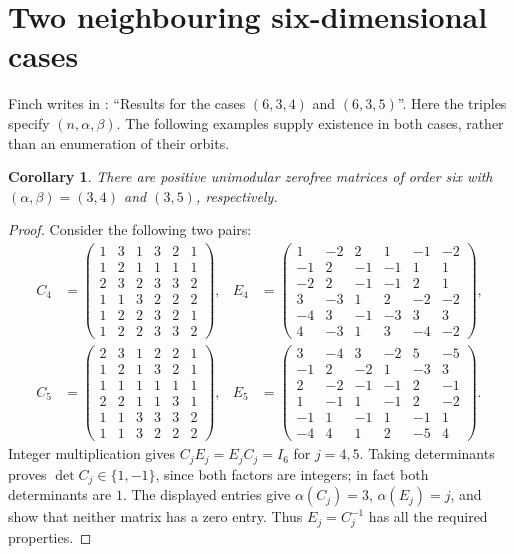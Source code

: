 \documentclass[11pt,a4paper]{article}
\newtheorem{corollary}[theorem]{Corollary}
\begin{document}
\section{Two neighbouring six-dimensional cases}
Finch writes in \cite[Section 8, p.~11]{finch}:
``Results for the cases $(6,3,4)$ and $(6,3,5)$''.
Here the triples specify $(n,\alpha,\beta)$. The following examples supply
existence in both cases, rather than an enumeration of their orbits.

\begin{corollary}\label{cor:neighbours}
There are positive unimodular zerofree matrices of order six with
$(\alpha,\beta)=(3,4)$ and $(3,5)$, respectively.
\end{corollary}
\begin{proof}
Consider the following two pairs:
\begin{align*}
 C_4&=\begin{pmatrix}
 1&3&1&3&2&1\\1&2&1&1&1&1\\2&3&2&3&3&2\\
 1&1&3&2&2&2\\1&2&2&3&2&1\\1&2&2&3&3&2
 \end{pmatrix},&
 E_4&=\begin{pmatrix}
 1&-2&2&1&-1&-2\\-1&2&-1&-1&1&1\\-2&2&-1&-1&2&1\\
 3&-3&1&2&-2&-2\\-4&3&-1&-3&3&3\\4&-3&1&3&-4&-2
 \end{pmatrix},\\[4pt]
 C_5&=\begin{pmatrix}
 2&3&1&2&2&1\\1&2&1&3&2&1\\1&1&1&1&1&1\\
 2&2&1&1&3&1\\1&1&3&3&3&2\\1&1&3&2&2&2
 \end{pmatrix},&
 E_5&=\begin{pmatrix}
 3&-4&3&-2&5&-5\\-1&2&-2&1&-3&3\\2&-2&-1&-1&2&-1\\
 1&-1&1&-1&2&-2\\-1&1&-1&1&-1&1\\-4&4&1&2&-5&4
 \end{pmatrix}.
\end{align*}
Integer multiplication gives $C_jE_j=E_jC_j=I_6$ for $j=4,5$.
Taking determinants proves $\det C_j\in\{1,-1\}$, since both factors
are integers; in fact both determinants are $1$.
The displayed entries give $\alpha(C_j)=3$, $\alpha(E_j)=j$,
and show that neither matrix has a zero entry. Thus $E_j=C_j^{-1}$
has all the required properties.
\end{proof}
\end{document}
